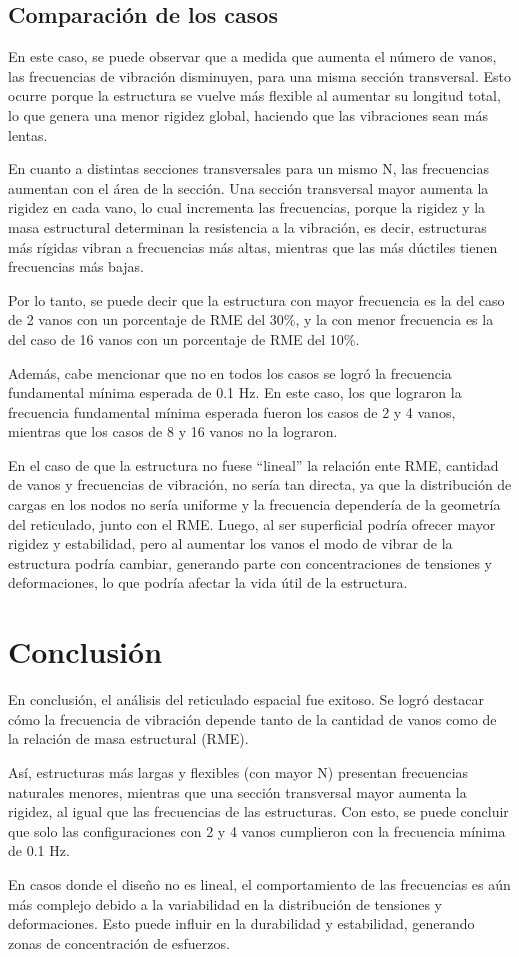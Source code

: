 \subsection{Comparación de los casos}

En este caso, se puede observar que a medida que aumenta el número de vanos, las frecuencias de vibración disminuyen, para una misma sección transversal. Esto ocurre porque la estructura se vuelve más flexible al aumentar su longitud total, lo que genera una menor rigidez global, haciendo que las vibraciones sean más lentas.

En cuanto a distintas secciones transversales para un mismo N, las frecuencias aumentan con el área de la sección. Una sección transversal mayor aumenta la rigidez en cada vano, lo cual incrementa las frecuencias, porque la rigidez y la masa estructural determinan la resistencia a la vibración, es decir, estructuras más rígidas vibran a frecuencias más altas, mientras que las más dúctiles tienen frecuencias más bajas.

Por lo tanto, se puede decir que la estructura con mayor frecuencia es la del caso de 2 vanos con un porcentaje de RME del 30\%, y la con menor frecuencia es la del caso de 16 vanos con un porcentaje de RME del 10\%.

Además, cabe mencionar que no en todos los casos se logró la frecuencia fundamental mínima esperada de 0.1 Hz. En este caso, los que lograron la frecuencia fundamental mínima esperada fueron los casos de 2 y 4 vanos, mientras que los casos de 8 y 16 vanos no la lograron.

En el caso de que la estructura no fuese ``lineal'' la relación ente RME, cantidad de vanos y frecuencias de vibración, no sería tan directa, ya que la distribución de cargas en los nodos no sería uniforme y la frecuencia dependería de la geometría del reticulado, junto con el RME. Luego, al ser superficial podría ofrecer mayor rigidez y estabilidad, pero al aumentar los vanos el modo de vibrar de la estructura podría cambiar, generando parte con concentraciones de tensiones y deformaciones, lo que podría afectar la vida útil de la estructura.  

\newpage

\section{Conclusión}

En conclusión, el análisis del reticulado espacial fue exitoso. Se logró destacar cómo la frecuencia de vibración depende tanto de la cantidad de vanos como de la relación de masa estructural (RME). 

Así, estructuras más largas y flexibles (con mayor N) presentan frecuencias naturales menores, mientras que una sección transversal mayor aumenta la rigidez, al igual que las frecuencias de las estructuras. Con esto, se puede concluir que solo las configuraciones con 2 y 4 vanos cumplieron con la frecuencia mínima de 0.1 Hz.

En casos donde el diseño no es lineal, el comportamiento de las frecuencias es aún más complejo debido a la variabilidad en la distribución de tensiones y deformaciones. Esto puede influir en la durabilidad y estabilidad, generando zonas de concentración de esfuerzos. 
